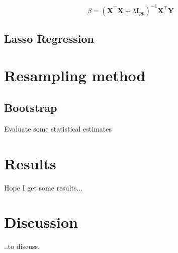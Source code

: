 \documentclass[a4paper,12pt, english]{article}
\begin{document}
\begin{equation}
\hat{\beta} = (\mathbf{X}^{\top}\mathbf{X} + \lambda\mathbf{I}_{pp})^{-1}\mathbf{X}^{\top}\mathbf{Y}
\end{equation}

\subsection*{Lasso Regression}


\section*{Resampling method}



\subsection*{Bootstrap}

Evaluate some statistical estimates

\section*{Results}

Hope I get some results...

\section*{Discussion}

..to discuss. 
\end{document}
